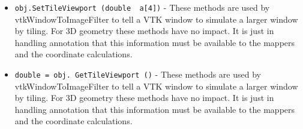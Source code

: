 \begin{itemize}
\item  \verb|obj.SetTileViewport (double  a[4])| -  These methods are used by vtkWindowToImageFilter to tell a VTK window
 to simulate a larger window by tiling. For 3D geometry these methods
 have no impact. It is just in handling annotation that this information
 must be available to the mappers and the coordinate calculations.

\item  \verb|double = obj. GetTileViewport ()| -  These methods are used by vtkWindowToImageFilter to tell a VTK window
 to simulate a larger window by tiling. For 3D geometry these methods
 have no impact. It is just in handling annotation that this information
 must be available to the mappers and the coordinate calculations.

\end{itemize}
